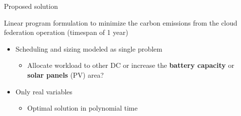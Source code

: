 \documentclass[Ligatures=TeX,table,svgnames,usetotalslideindicator,compress,10pt,aspectratio=169]{beamer}
\begin{document}
\begin{frame}{Proposed solution}
 
  Linear program formulation to minimize the carbon emissions from the cloud federation operation (timespan of 1 year) \footnotemark[2]
  
  \begin{itemize}
    
  \item Scheduling and sizing modeled as single problem
    \begin{itemize}
      
    \item Allocate workload to other DC or increase the \textbf{battery capacity} or \textbf{solar panels} (PV) area?
    \end{itemize}
    
  \item Only real variables 
    \begin{itemize}     
    \item  Optimal solution in polynomial time

    \end{itemize}

  \end{itemize}
    
\end{frame}
\end{document}
